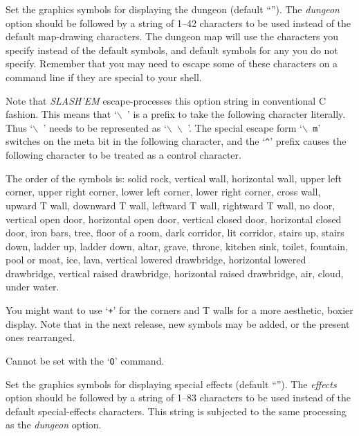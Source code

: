\item[\ib{dungeon}]
Set the graphics symbols for displaying the dungeon
(default \relax{}``'').
The
{\it dungeon\/} 
option should be followed by a string of 1--42
characters to be used instead of the default map-drawing characters.
The dungeon map will use the characters you specify instead of the
default symbols, and default symbols for any you do not specify.
Remember that you may need to escape some of these characters
on a command line if they are special to your shell.

Note that {\it SLASH'EM\/} escape-processes this option string in conventional C
fashion.  This means that `{\tt $\backslash$ }' is a prefix to take the following
character literally.  Thus `{\tt $\backslash$ }' needs to be represented as `{\tt $\backslash$ $\backslash$ }'.
The special escape
form `{\tt $\backslash$ m}' switches on the meta bit in the following character, and the `{\tt \^{}}'
prefix causes the following character to be treated as a control
character.

The order of the symbols is:  solid rock, vertical wall, horizontal
wall, upper left corner, upper right corner, lower left corner, lower
right corner, cross wall, upward T wall, downward T wall, leftward T
wall, rightward T wall, no door, vertical open door, horizontal open
door, vertical closed door, horizontal closed door, iron bars, tree,
floor of a room, dark corridor, lit corridor, stairs up, stairs down,
ladder up, ladder down, altar, grave, throne, kitchen sink, toilet,
fountain, pool or moat,
ice, lava, vertical lowered drawbridge, horizontal lowered drawbridge,
vertical raised drawbridge, horizontal raised drawbridge, air, cloud,
under water.

You might want to use `{\tt +}' for the corners and T walls for a more
aesthetic, boxier display.  Note that in the next release, new symbols
may be added, or the present ones rearranged.

Cannot be set with the `{\tt O}' command.

\item[\ib{effects}]
Set the graphics symbols for displaying special effects
(default \relax{}``'').
The
{\it effects\/} 
option should be followed by a string of 1--83
characters to be used instead of the default special-effects characters.
This string is subjected to the same processing as the
{\it dungeon\/} 
option.

